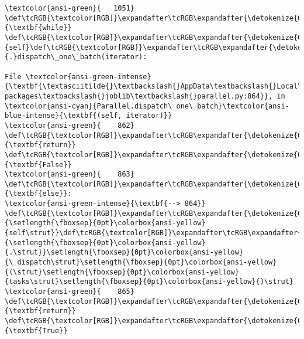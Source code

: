 \documentclass[11pt]{article}
\begin{document}
\begin{Verbatim}[commandchars=\\\{\}, frame=single, framerule=2mm, rulecolor=\color{outerrorbackground}]
\textcolor{ansi-green}{   1051}     \def\tcRGB{\textcolor[RGB]}\expandafter\tcRGB\expandafter{\detokenize{0,135,0}}{\textbf{while}} \def\tcRGB{\textcolor[RGB]}\expandafter\tcRGB\expandafter{\detokenize{0,135,0}}{self}\def\tcRGB{\textcolor[RGB]}\expandafter\tcRGB\expandafter{\detokenize{98,98,98}}{.}dispatch\_one\_batch(iterator):

File \textcolor{ansi-green-intense}{\textbf{\textasciitilde{}\textbackslash{}AppData\textbackslash{}Local\textbackslash{}anaconda3\textbackslash{}lib\textbackslash{}site-packages\textbackslash{}joblib\textbackslash{}parallel.py:864}}, in \textcolor{ansi-cyan}{Parallel.dispatch\_one\_batch}\textcolor{ansi-blue-intense}{\textbf{(self, iterator)}}
\textcolor{ansi-green}{    862}     \def\tcRGB{\textcolor[RGB]}\expandafter\tcRGB\expandafter{\detokenize{0,135,0}}{\textbf{return}} \def\tcRGB{\textcolor[RGB]}\expandafter\tcRGB\expandafter{\detokenize{0,135,0}}{\textbf{False}}
\textcolor{ansi-green}{    863} \def\tcRGB{\textcolor[RGB]}\expandafter\tcRGB\expandafter{\detokenize{0,135,0}}{\textbf{else}}:
\textcolor{ansi-green-intense}{\textbf{--> 864}}     \def\tcRGB{\textcolor[RGB]}\expandafter\tcRGB\expandafter{\detokenize{0,135,0}}{\setlength{\fboxsep}{0pt}\colorbox{ansi-yellow}{self\strut}}\def\tcRGB{\textcolor[RGB]}\expandafter\tcRGB\expandafter{\detokenize{98,98,98}}{\setlength{\fboxsep}{0pt}\colorbox{ansi-yellow}{.\strut}}\setlength{\fboxsep}{0pt}\colorbox{ansi-yellow}{\_dispatch\strut}\setlength{\fboxsep}{0pt}\colorbox{ansi-yellow}{(\strut}\setlength{\fboxsep}{0pt}\colorbox{ansi-yellow}{tasks\strut}\setlength{\fboxsep}{0pt}\colorbox{ansi-yellow}{)\strut}
\textcolor{ansi-green}{    865}     \def\tcRGB{\textcolor[RGB]}\expandafter\tcRGB\expandafter{\detokenize{0,135,0}}{\textbf{return}} \def\tcRGB{\textcolor[RGB]}\expandafter\tcRGB\expandafter{\detokenize{0,135,0}}{\textbf{True}}


\end{Verbatim}
\end{document}
